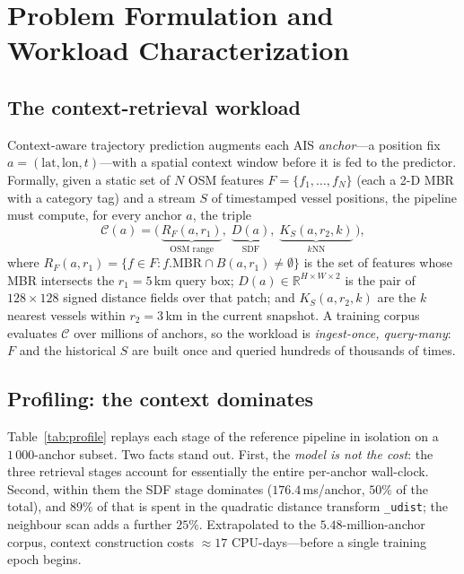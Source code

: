 \section{Problem Formulation and Workload Characterization}\label{sec:problem}

\subsection{The context-retrieval workload}
Context-aware trajectory prediction augments each AIS \emph{anchor}---a
position fix $a=(\mathrm{lat},\mathrm{lon},t)$---with a spatial context
window before it is fed to the predictor. Formally, given a static set of
$N$ OSM features $F=\{f_1,\dots,f_N\}$ (each a 2-D MBR with a category
tag) and a stream $S$ of timestamped vessel positions, the pipeline must
compute, for every anchor $a$, the triple
\begin{equation}
\mathcal{C}(a)=\bigl(\,\underbrace{R_F(a,r_1)}_{\text{OSM range}},\;
\underbrace{D(a)}_{\text{SDF}},\;
\underbrace{K_S(a,r_2,k)}_{\text{$k$NN}}\,\bigr),
\end{equation}
where $R_F(a,r_1)=\{f\in F: f.\mathrm{MBR}\cap B(a,r_1)\neq\emptyset\}$ is
the set of features whose MBR intersects the $r_1\!=\!5$\,km query box;
$D(a)\in\mathbb{R}^{H\times W\times 2}$ is the pair of
$128\!\times\!128$ signed distance fields over that patch; and
$K_S(a,r_2,k)$ are the $k$ nearest vessels within $r_2\!=\!3$\,km in the
current snapshot. A training corpus evaluates $\mathcal{C}$ over millions
of anchors, so the workload is \emph{ingest-once, query-many}: $F$ and the
historical $S$ are built once and queried hundreds of thousands of times.

\subsection{Profiling: the context dominates}
Table~\ref{tab:profile} replays each stage of the reference pipeline in
isolation on a $1\,000$-anchor subset. Two facts stand out. First, the
\emph{model is not the cost}: the three retrieval stages account for
essentially the entire per-anchor wall-clock. Second, within them the SDF
stage dominates ($176.4$\,ms/anchor, $50\%$ of the total), and $89\%$ of
that is spent in the quadratic distance transform \texttt{\_udist}; the
neighbour scan adds a further $25\%$. Extrapolated to the
$5.48$-million-anchor corpus, context construction costs
$\approx\!17$ CPU-days---before a single training epoch begins.

